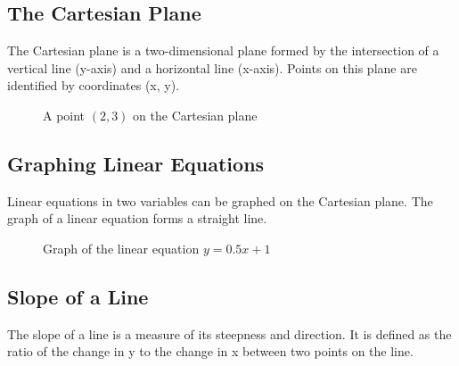 \documentclass[a4paper,12pt]{book}
\begin{document}
\subsection{The Cartesian Plane}
\label{subsec:the_cartesian_plane}
The Cartesian plane is a two-dimensional plane formed by the intersection of a vertical line (y-axis) and a horizontal line (x-axis). Points on this plane are identified by coordinates (x, y).

\begin{figure}[H]
\centering
{}
\caption{A point $(2,3)$ on the Cartesian plane}
\end{figure}

\subsection{Graphing Linear Equations}
\label{subsec:graphing_linear_equations}
Linear equations in two variables can be graphed on the Cartesian plane. The graph of a linear equation forms a straight line.

\begin{figure}[H]
\centering
{}
\caption{Graph of the linear equation $y = 0.5x + 1$}
\end{figure}

\subsection{Slope of a Line}
\label{subsec:slope_of_a_line}
The slope of a line is a measure of its steepness and direction. It is defined as the ratio of the change in y to the change in x between two points on the line.
\end{document}
